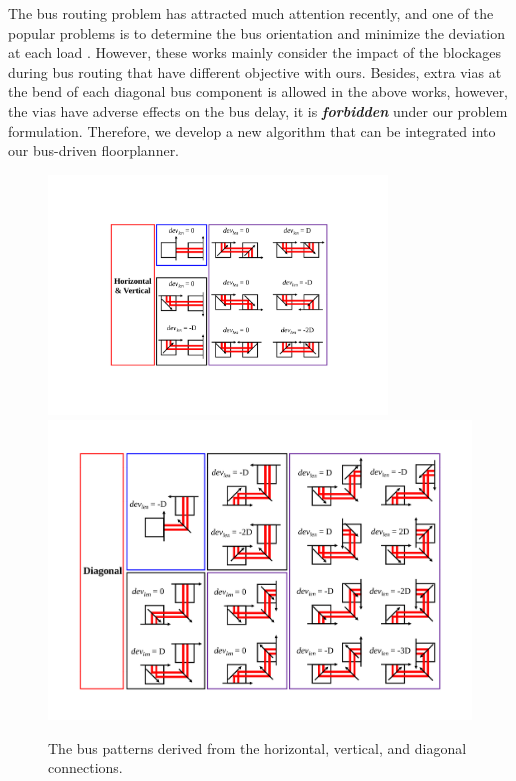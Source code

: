 The bus routing problem has attracted much attention recently, and
one of the popular problems is to determine the bus orientation
and minimize the deviation at each load \cite {Mo07_1, Mo07_2}.
However, these works mainly consider the impact of the blockages
during bus routing that have different objective with ours.
Besides, extra vias at the bend of each diagonal bus component
is allowed in the above works, however, the vias have adverse
effects on the bus delay, it is \textbf{\textit{forbidden}} under
our problem formulation.
Therefore, we develop a new algorithm that can be integrated into
our bus-driven floorplanner.

\begin{figure}[htb]
  \centering
    \includegraphics[width=9cm]{Fig/deviation_pattern1.pdf}
  \centering
    \includegraphics[width=12cm]{Fig/deviation_pattern2.pdf}
     \caption{
      The bus patterns derived from the horizontal, vertical, and diagonal connections.
   }
  \label{fig::deviation_pattern1}
\end{figure}


